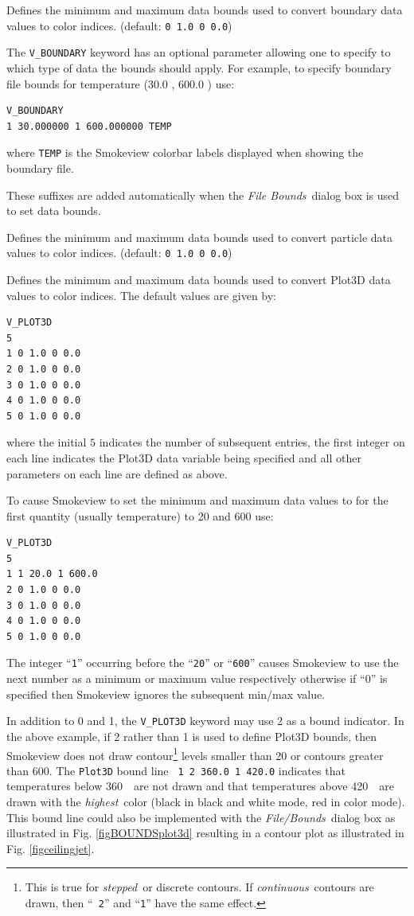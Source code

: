 \documentclass[11pt,twoside]{book}
\newcommand{\hitem}[1]{\item[{\bf #1} \hfill]}
\begin{document}
\hitem{V\_BOUNDARY}Defines the minimum and maximum
data bounds used to convert boundary data values to color indices.
(default: {\tt 0 1.0 0 0.0})

The {\tt V\_BOUNDARY} keyword has an optional parameter allowing
one to specify to which type of data the bounds should apply. For
example, to specify boundary file bounds for temperature (30.0
\degC, 600.0 \degC) use:
\begin{lstlisting}
V_BOUNDARY
1 30.000000 1 600.000000 TEMP
\end{lstlisting}
where {\tt TEMP} is the Smokeview colorbar labels displayed when
showing the boundary file.

These suffixes are added automatically when the {\em File Bounds}\
dialog box is used to set data bounds.

\hitem{V\_PARTICLES}Defines the minimum and maximum
data bounds used to convert particle data values to color indices.
(default: {\tt 0 1.0 0 0.0})

\hitem{V\_PLOT3D}Defines the minimum and maximum data bounds used
to convert Plot3D data values to color indices. The default values
are given by:
\begin{lstlisting}
V_PLOT3D
5
1 0 1.0 0 0.0
2 0 1.0 0 0.0
3 0 1.0 0 0.0
4 0 1.0 0 0.0
5 0 1.0 0 0.0
\end{lstlisting}
where the initial $5$ indicates the number of subsequent entries,
the first integer on each line indicates the Plot3D data variable
being specified and all other parameters on each line are defined
as above.

To cause Smokeview to set the minimum and maximum data values to
for the first quantity (usually temperature) to 20 and 600 use:

\begin{lstlisting}
V_PLOT3D
5
1 1 20.0 1 600.0
2 0 1.0 0 0.0
3 0 1.0 0 0.0
4 0 1.0 0 0.0
5 0 1.0 0 0.0
\end{lstlisting}
The integer ``{\tt 1}'' occurring before the ``{\tt 20}'' or
``{\tt 600}'' causes Smokeview to use the next number as a minimum
or maximum value respectively otherwise if ``0'' is specified then
Smokeview ignores the subsequent min/max value.

In addition to 0 and 1, the {\tt V\_PLOT3D} keyword may use 2 as a
bound indicator. In the above example, if 2 rather than 1 is used
to define Plot3D bounds, then Smokeview does not draw
contour\footnote{This is true for {\em stepped}\ or discrete
contours.  If {\em continuous}\ contours are drawn, then ``{\tt
2}'' and ``{\tt 1}'' have the same effect. } levels smaller than
20 or contours greater than 600. The {\tt Plot3D} bound line {\tt
1 2 360.0 1 420.0} indicates that temperatures below 360~\degC\
are not drawn and that temperatures above 420~\degC\ are drawn
with the {\em highest}\ color (black in black and white mode, red
in color mode).  This bound line could also be implemented with
the {\em File/Bounds}\ dialog box as illustrated in Fig.
\ref{figBOUNDSplot3d} resulting in a contour plot as illustrated
in Fig. \ref{figceilingjet}.
\end{document}
